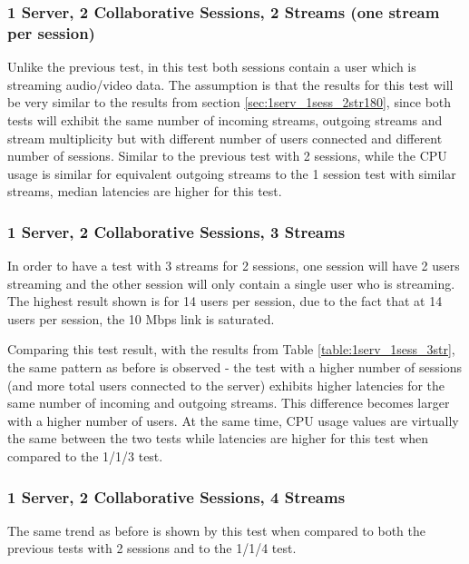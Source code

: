 \subsubsection{1 Server, 2 Collaborative Sessions, 2 Streams (one stream per session)}
\label{sec:1serv_2sess_2str}

Unlike the previous test, in this test both sessions contain a user which is streaming audio/video data. The assumption is that the results for this test will be very similar to the results from section \ref{sec:1serv_1sess_2str180}, since both tests will exhibit the same number of incoming streams, outgoing streams and stream multiplicity but with different number of users connected and different number of sessions. Similar to the previous test with 2 sessions, while the CPU usage is similar for equivalent outgoing streams to the 1 session test with similar streams, median latencies are higher for this test.

\subsubsection{1 Server, 2 Collaborative Sessions, 3 Streams}
\label{sec:1serv_2sess_3str}

In order to have a test with 3 streams for 2 sessions, one session will have 2 users streaming and the other session will only contain a single user who is streaming. The highest result shown is for 14 users per session, due to the fact that at 14 users per session, the 10 Mbps link is saturated.

Comparing this test result, with the results from Table \ref{table:1serv_1sess_3str}, the same pattern as before is observed - the test with a higher number of sessions (and more total users connected to the server) exhibits higher latencies for the same number of incoming and outgoing streams. This difference becomes larger with a higher number of users. At the same time, CPU usage values are virtually the same between the two tests while latencies are higher for this test when compared to the 1/1/3 test.

\subsubsection{1 Server, 2 Collaborative Sessions, 4 Streams}
\label{sec:1serv_2sess_4str}

The same trend as before is shown by this test when compared to both the previous tests with 2 sessions and to the 1/1/4 test.


